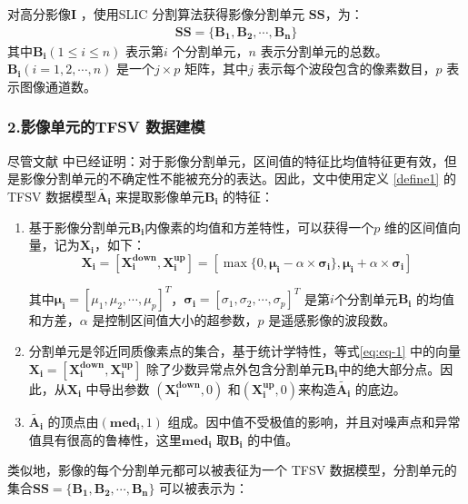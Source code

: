 对高分影像$\bm{I}$ ，使用SLIC 分割算法获得影像分割单元 $\bm{SS}$，为：
\begin{equation}\label{eq:image_ss}
    \begin{split}
        \bm{SS} = \lbrace \bm{B_1}, \bm{B_2},\bm{\cdots}, \bm{B_n} \rbrace
    \end{split}
\end{equation}
其中$\bm{B_i}(1 \leq i \leq n)$ 表示第$i$ 个分割单元，$n$ 表示分割单元的总数。 $\bm{B_i}(i=1,2,\cdots, n)$ 是一个$j \times p$ 矩阵，其中$j$ 表示每个波段包含的像素数目，$p$ 表示图像通道数。


\subsubsection*{2.影像单元的TFSV 数据建模}
尽管文献\cite{he2016remote} 中已经证明：对于影像分割单元，区间值的特征比均值特征更有效，但是影像分割单元的不确定性不能被充分的表达。因此，文中使用定义 \ref{define1} 的TFSV 数据模型$\bm{\tilde{A_i}}$  来提取影像单元$\bm{B_i}$ 的特征：
\begin{enumerate}[ 1)]
    \item 基于影像分割单元$\bm{B_i}$内像素的均值和方差特性，可以获得一个$p$ 维的区间值向量，记为$\bm{X_i}$，如下：
          \begin{equation}\label{eq:eq-1}
              \bm{X_i} = [\bm{X_{i}^{down}},\bm{X_i^{up} }] = [\max{\lbrace 0,\bm{\mu_i} - \alpha \times \bm{\sigma_i} \rbrace}, \bm{\mu_i} + \alpha \times \bm{\sigma_i}]
          \end{equation}

          其中$\bm{\mu_i} = [\mu_{1}, \mu_2,\cdots,\mu_p]^T$，$\bm{\sigma_i} = [\sigma_{1},\sigma_2,\cdots,\sigma_p] ^T$ 是第$i$个分割单元$\bm{B_i}$ 的均值和方差，$\alpha$ 是控制区间值大小的超参数，$p$ 是遥感影像的波段数。
    \item 分割单元是邻近同质像素点的集合，基于统计学特性，等式\ref{eq:eq-1} 中的向量$\bm{X_i} = [\bm{X_{i}^{down}},\bm{X_i^{up} }]$ 除了少数异常点外包含分割单元$\bm{B_i}$中的绝大部分点。因此，从$\bm{X_i}$ 中导出参数 $(\bm{X_{i}^{down}},0)$ 和$(\bm{X_i^{up}},0)$来构造$\bm{\tilde{A_i}}$ 的底边。
    \item $\bm{\tilde{A_i}}$ 的顶点由$(\bm{med_i},1)$ 组成。因中值不受极值的影响，并且对噪声点和异常值具有很高的鲁棒性，这里$\bm{med_i}$ 取$\bm{B_i}$ 的中值。
\end{enumerate}


类似地，影像的每个分割单元都可以被表征为一个 TFSV 数据模型，分割单元的集合$\bm{SS} = \lbrace \bm{B_1}, \bm{B_2},\bm{\cdots}, \bm{B_n} \rbrace$ 可以被表示为：

